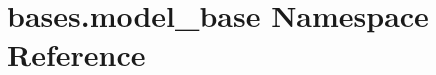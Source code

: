 \hypertarget{namespacebases_1_1model__base}{}\section{bases.\+model\+\_\+base Namespace Reference}
\label{namespacebases_1_1model__base}
